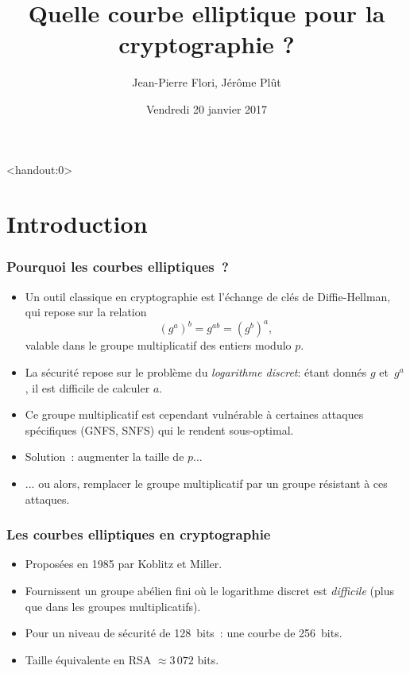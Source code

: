 \documentclass[francais]{beamer}
\begin{document}
\title[Quelle courbe elliptique ?]{Quelle courbe elliptique pour la cryptographie ?}
\author[J.-P. Flori]{Jean-Pierre Flori, Jérôme Plût}
\date[20/01/2017]{Vendredi 20 janvier 2017}

\begin{frame}<handout:0> \titlepage
\end{frame}

\section{Introduction}

\begin{frame}\frametitle{Pourquoi les courbes elliptiques ?}
\begin{itemize}
\item Un outil classique en cryptographie est
l'échange de clés de Diffie-Hellman, qui repose sur la relation
\[ (g^a)^b = g^{ab} = (g^b)^a, \]
valable dans le groupe multiplicatif des entiers modulo $p$.
\item La sécurité repose sur le problème du \emph{logarithme discret}:
étant donnés $g$ et~$g^a$, il est difficile de calculer $a$.
\item Ce groupe multiplicatif est cependant vulnérable
à certaines attaques spécifiques (GNFS, SNFS)
qui le rendent sous-optimal.
\item Solution : augmenter la taille de $p$...
\item ... ou alors, remplacer le groupe multiplicatif
par un groupe résistant à ces attaques.
\end{itemize}
\end{frame}

\begin{frame}\frametitle{Les courbes elliptiques en cryptographie}
\begin{itemize}
\item Proposées en 1985 par Koblitz et Miller.
\item Fournissent un groupe abélien fini
où le logarithme discret est \emph{difficile}
(plus que dans les groupes multiplicatifs).
\end{itemize}
\begin{example}
\begin{itemize}
\item Pour un niveau de sécurité de 128~bits : une courbe de 256~bits.
\item Taille équivalente en RSA $≈ 3\,072$ bits.
\end{itemize}
\end{example}
\end{frame}
\end{document}
